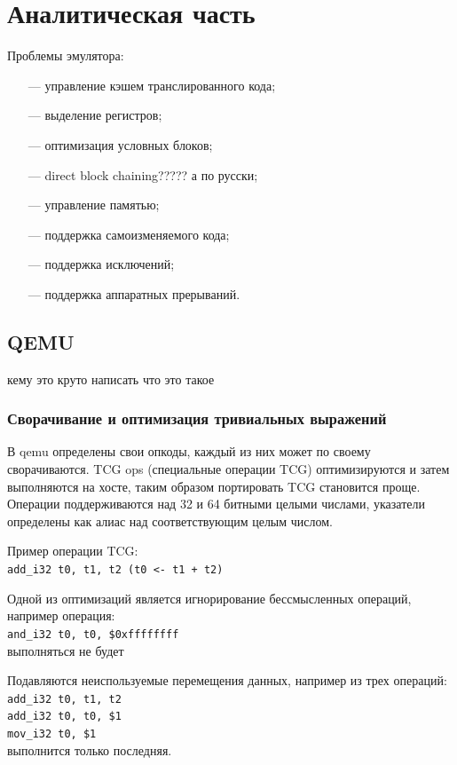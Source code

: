 \section{Аналитическая часть}

Проблемы эмулятора:
\begin{itemize}[leftmargin=1.6\parindent]
	\item[---] управление кэшем транслированного кода;
	\item[---] выделение регистров;
	\item[---] оптимизация условных блоков;
	\item[---] direct block chaining????? а по русски;
	\item[---] управление памятью;
	\item[---] поддержка самоизменяемого кода;
	\item[---] поддержка исключений;
	\item[---] поддержка аппаратных прерываний.
\end{itemize}

\subsection{QEMU}

кему это круто написать что это такое

\subsubsection{Сворачивание и оптимизация тривиальных выражений}

В qemu определены свои опкоды, каждый из них может по своему сворачиваются. TCG ops (специальные операции TCG) оптимизируются и затем выполняются на хосте, таким образом портировать TCG становится проще. Операции поддерживаются над 32 и 64 битными целыми числами, указатели определены как алиас над соответствующим целым числом.

Пример операции TCG:\\
\texttt{add\_i32 t0, t1, t2  (t0 <- t1 + t2)}

Одной из оптимизаций является игнорирование бессмысленных операций, например операция:\\
\texttt{and\_i32 t0, t0, \$0xffffffff\\}
выполняться не будет

Подавляются неиспользуемые перемещения данных, например из трех операций:\\
\texttt{add\_i32 t0, t1, t2\\
add\_i32 t0, t0, \$1\\
mov\_i32 t0, \$1\\}
выполнится только последняя.

